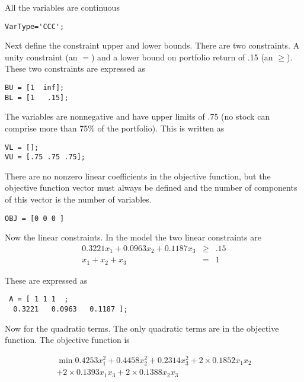 \documentclass[11pt]{article}
\renewcommand{\_}{{\char"5F}}
\renewcommand{\{}{{\char"7B}}
\renewcommand{\}}{{\char"7D}}
\renewcommand{\^}{{\char"0D}}
\renewcommand{\'}{{\char"0D}}
\begin{document}
All the variables are continuous


\begin{verbatim}
VarType='CCC';
\end{verbatim}


Next define the constraint upper and lower bounds. There are two constraints. A unity constraint (an $=$) and a lower bound on portfolio return of .15 (an $\ge$). These two constraints are expressed as



\begin{verbatim}
BU = [1  inf];
BL = [1   .15];
\end{verbatim}



The variables are nonnegative and have upper limits of .75 (no stock can comprise more than 75\% of the portfolio).  This is written as




\begin{verbatim}
VL = [];
VU = [.75 .75 .75];
\end{verbatim}



There are no nonzero linear coefficients in the objective function, but the objective function vector must always be defined and the number of components of this vector is the number of variables.



\begin{verbatim}
OBJ = [0 0 0 ]
\end{verbatim}


 Now the linear constraints.   In the model the two linear constraints are
 \begin{eqnarray*}
 0.3221 x_{1} +   0.0963x_{2} +    0.1187x_{3}  &\ge& .15 \\
x_{1} + x_{2} + x_{3} &=& 1
 \end{eqnarray*}



 These are expressed as



 \begin{verbatim}
 A = [ 1 1 1  ;
  0.3221   0.0963   0.1187 ];
 \end{verbatim}


Now for the quadratic terms. The only quadratic terms are in the objective function. The objective function is


\begin{eqnarray*}
\min  0.4253 x_{1}^{2} +  0.4458 x_{2}^{2} + 0.2314 x_{3}^{2} + 2 \times 0.1852 x_{1} x_{2} \\ + 2 \times 0.1393 x_{1} x_{3} + 2 \times
 0.1388 x_{2} x_{3}
\end{eqnarray*}
\end{document}
